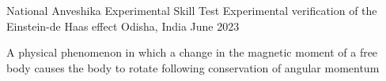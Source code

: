 \begin{cventries}
\cventry
{National Anveshika Experimental Skill Test} %
{Experimental verification of the Einstein-de Haas effect } %
{Odisha, India} %
{June 2023} %
{
	\begin{cvitems} %
		\item{ A physical phenomenon in which a change in the magnetic moment of a free body causes the body to rotate following conservation of angular momentum}
	\end{cvitems}
}
%

\end{cventries}
